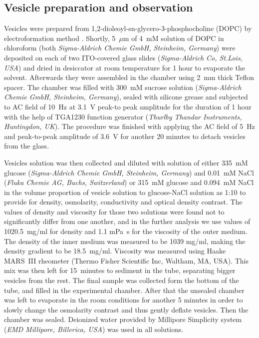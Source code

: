 \documentclass[10pt,a4paper,draft]{article}
\begin{document}
\subsection{Vesicle preparation and observation}
Vesicles were prepared from 1,2-dioleoyl-sn-glycero-3-phosphocholine \newline (DOPC) by electroformation method \cite{Angelova1986}.
Shortly, 5~$\mu$m of 4~mM solution of DOPC in chloroform (both \emph{Sigma-Aldrich Chemie GmbH, Steinheim, Germany}) were deposited on each of two ITO-covered glass slides (\emph{Sigma-Aldrich Co, St.Lois, USA}) and dried in desiccator at room temperature for 1 hour to evaporate the solvent.
Afterwards they were assembled in the chamber using 2~mm thick Teflon spacer.
The chamber was filled with 300~mM sucrose solution (\emph{Sigma-Aldrich Chemie GmbH, Steinheim, Germany}), sealed with silicone grease and subjected to AC field of 10~Hz at 3.1~V peak-to peak amplitude for the duration of 1 hour with the help of TGA1230 function generator (\emph{Thurlby Thandar Instruments, Huntingdon, UK}).
The procedure was finished with applying the AC field of 5~Hz and peak-to-peak amplitude of 3.6~V for another 20 minutes to detach vesicles from the glass.

Vesicles solution was then collected and diluted with solution of either 335~mM glucose (\emph{Sigma-Aldrich Chemie GmbH, Steinheim, Germany}) and 0.01~mM NaCl (\emph{Fluka Chemie AG, Buchs, Switzerland}) or 315~mM glucose and 0.094~mM NaCl in the volume proportion of vesicle solution to glucose-NaCl solution as 1:10 to provide for density, osmolarity, conductivity and optical density contrast. The values of density and viscosity for those two solutions were found not to significantly differ from one another, and in the further analysis we use values of 1020.5~mg/ml for density and 1.1 mPa~s for the viscosity of the outer medium. The density of the inner medium was measured to be 1039 mg/ml, making the density gradient to be 18.5~mg/ml. Viscosity was measured using Haake MARS~III rheometer (Thermo Fisher Scientific Inc, Waltham, MA, USA).
This mix was then left for 15~minutes to sediment in the tube, separating bigger vesicles from the rest.
The final sample was collected form the bottom of the tube, and filled in the experimental chamber.
After that the unsealed chamber was left to evaporate in the room conditions for another 5 minutes in order to slowly change the osmolarity contrast and thus gently deflate vesicles.
Then the chamber was sealed.
Deionized water provided by Millipore Simplicity system (\emph{EMD Millipore, Billerica, USA}) was used in all solutions.
\end{document}
